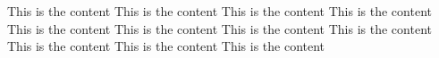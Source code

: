 \documentclass[UTF8,a1paper,twoside,11pt]{article}
\begin{document}
This is the content
This is the content
This is the content
This is the content
This is the content
This is the content
This is the content
This is the content
This is the content
This is the content
This is the content
\end{document}
